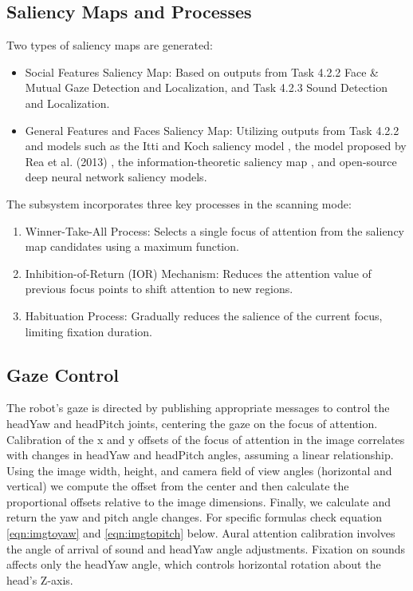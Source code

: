 \documentclass{CSSRforAfrica}
\begin{document}
\subsection{Saliency Maps and Processes}
 
Two types of saliency maps are generated:
\begin{itemize}
	\item Social Features Saliency Map: Based on outputs from Task 4.2.2 Face \& Mutual Gaze Detection and Localization, and Task 4.2.3 Sound Detection and Localization.
	\item General Features and Faces Saliency Map: Utilizing outputs from Task 4.2.2 and models such as the Itti and Koch saliency model \cite{IttiKochNiebur98, IttiKoch00, IttiKoch01}, the model proposed by Rea et al. (2013) \cite{ReaMettaBartolazzi13}, the information-theoretic saliency map \cite{BruceTsotsos09}, and open-source deep neural network saliency models.
\end{itemize}
The subsystem incorporates three key processes in the scanning mode:
\begin{enumerate}
	\item Winner-Take-All Process: Selects a single focus of attention from the saliency map candidates using a maximum function.
	\item Inhibition-of-Return (IOR) Mechanism: Reduces the attention value of previous focus points to shift attention to new regions.
	\item Habituation Process: Gradually reduces the salience of the current focus, limiting fixation duration.
\end{enumerate}
 
\subsection{Gaze Control}
 
The robot’s gaze is directed by publishing appropriate messages to control the headYaw and headPitch joints, centering the gaze on the focus of attention. Calibration of the x and y offsets of the focus of attention in the image correlates with changes in headYaw and headPitch angles, assuming a linear relationship. Using the image width, height, and camera field of view angles (horizontal and vertical) we compute the offset from the center and then calculate the proportional offsets relative to the image dimensions. Finally, we calculate and return the yaw and pitch angle changes. For specific formulas check equation \eqref{eqn:imgtoyaw} and \eqref{eqn:imgtopitch} below. Aural attention calibration involves the angle of arrival of sound and headYaw angle adjustments. Fixation on sounds affects only the headYaw angle, which controls horizontal rotation about the head’s Z-axis.
 
\end{document}

